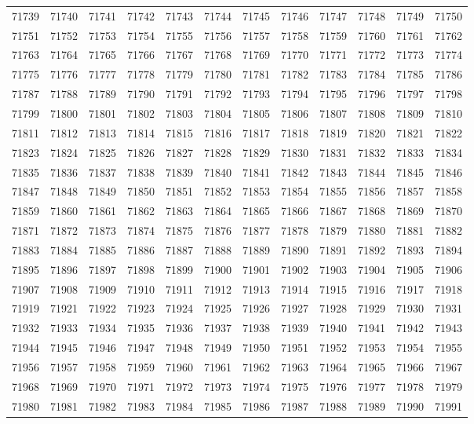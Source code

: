 \begin{center}
\begin{longtable}{llllllllllll}
71739 &71740 &71741 &71742 &71743 &71744 &71745 &71746 &71747 &71748 &71749 &71750 \\
71751 &71752 &71753 &71754 &71755 &71756 &71757 &71758 &71759 &71760 &71761 &71762 \\
71763 &71764 &71765 &71766 &71767 &71768 &71769 &71770 &71771 &71772 &71773 &71774 \\
71775 &71776 &71777 &71778 &71779 &71780 &71781 &71782 &71783 &71784 &71785 &71786 \\
71787 &71788 &71789 &71790 &71791 &71792 &71793 &71794 &71795 &71796 &71797 &71798 \\
71799 &71800 &71801 &71802 &71803 &71804 &71805 &71806 &71807 &71808 &71809 &71810 \\
71811 &71812 &71813 &71814 &71815 &71816 &71817 &71818 &71819 &71820 &71821 &71822 \\
71823 &71824 &71825 &71826 &71827 &71828 &71829 &71830 &71831 &71832 &71833 &71834 \\
71835 &71836 &71837 &71838 &71839 &71840 &71841 &71842 &71843 &71844 &71845 &71846 \\
71847 &71848 &71849 &71850 &71851 &71852 &71853 &71854 &71855 &71856 &71857 &71858 \\
71859 &71860 &71861 &71862 &71863 &71864 &71865 &71866 &71867 &71868 &71869 &71870 \\
71871 &71872 &71873 &71874 &71875 &71876 &71877 &71878 &71879 &71880 &71881 &71882 \\
71883 &71884 &71885 &71886 &71887 &71888 &71889 &71890 &71891 &71892 &71893 &71894 \\
71895 &71896 &71897 &71898 &71899 &71900 &71901 &71902 &71903 &71904 &71905 &71906 \\
71907 &71908 &71909 &71910 &71911 &71912 &71913 &71914 &71915 &71916 &71917 &71918 \\
71919 &71921 &71922 &71923 &71924 &71925 &71926 &71927 &71928 &71929 &71930 &71931 \\
71932 &71933 &71934 &71935 &71936 &71937 &71938 &71939 &71940 &71941 &71942 &71943 \\
71944 &71945 &71946 &71947 &71948 &71949 &71950 &71951 &71952 &71953 &71954 &71955 \\
71956 &71957 &71958 &71959 &71960 &71961 &71962 &71963 &71964 &71965 &71966 &71967 \\
71968 &71969 &71970 &71971 &71972 &71973 &71974 &71975 &71976 &71977 &71978 &71979 \\
71980 &71981 &71982 &71983 &71984 &71985 &71986 &71987 &71988 &71989 &71990 &71991 \\

\end{longtable}
\end{center}
